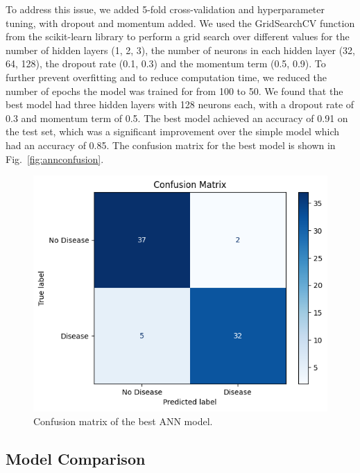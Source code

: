 To address this issue, we added 5-fold cross-validation and hyperparameter tuning, with dropout and momentum added. We used the GridSearchCV function from the scikit-learn library to perform a grid search over different values for the number of hidden layers (1, 2, 3), the number of neurons in each hidden layer (32, 64, 128), the dropout rate (0.1, 0.3) and the momentum term (0.5, 0.9). To further prevent overfitting and to reduce computation time, we reduced the number of epochs the model was trained for from 100 to 50. We found that the best model had three hidden layers with 128 neurons each, with a dropout rate of 0.3 and momentum term of 0.5. The best model achieved an accuracy of 0.91 on the test set, which was a significant improvement over the simple model which had an accuracy of 0.85. The confusion matrix for the best model is shown in Fig.~\ref{fig:annconfusion}.

\begin{figure}[htbp]
    \centerline{\includegraphics[width=0.7\columnwidth]{img/annconfusion.png}}
    \caption{Confusion matrix of the best ANN model.}\label{annconfusion}
\end{figure}

\subsection{Model Comparison}